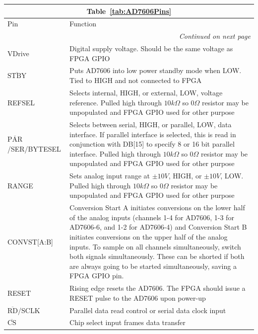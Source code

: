 \renewcommand{\arraystretch}{1.3}
\begin{singlespace}
\centering 
\begin{longtable}[h]{|p{1.5in}|p{3.5in}|}
\multicolumn{2}{c}{{Table~\ref{tab:AD7606Pins}}} \\
\hline
Pin	& Function\\
\endhead
\multicolumn{2}{r}{\textit{Continued on next page}} \\
\endfoot
\endlastfoot
\hline
VDrive	& Digital supply voltage.  Should be the same voltage as FPGA GPIO\\
\hline
$\overline{\mathrm{STBY}}$	& Puts AD7606 into low power standby mode when LOW.  Tied to HIGH and not connected to FPGA\\
\hline
REFSEL	& Selects internal, HIGH, or external, LOW, voltage reference.  Pulled high through $10\unit{k\Omega}$ so $0\unit{\Omega}$ resistor may be unpopulated and FPGA GPIO used for other purpose\\
\hline
$\overline{\mathrm{PAR}}$/SER/BYTESEL	& Selects between serial, HIGH, or parallel, LOW, data interface.  If parallel interface is selected, this is read in conjunction with DB[15] to specify 8 or 16 bit parallel interface.  Pulled high through $10\unit{k\Omega}$ so $0\unit{\Omega}$ resistor may be unpopulated and FPGA GPIO used for other purpose\\
\hline
RANGE	& Sets analog input range at $\pm10\unit{V}$, HIGH, or $\pm10\unit{V}$, LOW.  Pulled high through $10\unit{k\Omega}$ so $0\unit{\Omega}$ resistor may be unpopulated and FPGA GPIO used for other purpose\\
\hline
CONVST[A:B]	& Conversion Start A initiates conversions on the lower half of the analog inputs (channels 1-4 for AD7606, 1-3 for AD7606-6, and 1-2 for AD7606-4) and Conversion Start B initiates conversions on the upper half of the analog inputs.  To sample on all channels simultaneously, switch both signals simultaneously.  These can be shorted if both are always going to be started simultaneously, saving a FPGA GPIO pin.\\
\hline
RESET	& Rising edge resets the AD7606.  The FPGA should issue a RESET pulse to the AD7606 upon power-up\\
\hline
$\overline{\mathrm{RD}}$/SCLK	& Parallel data read control or serial data clock input\\
\hline
$\overline{\mathrm{CS}}$	& Chip select input frames data transfer\\
\hline

\end{longtable}
\end{singlespace}
